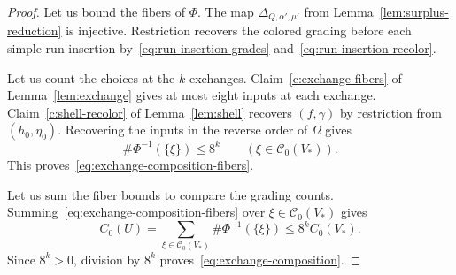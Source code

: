 \begin{proof}
Let us bound the fibers of $\Phi$.
The map $\Delta_{Q,\alpha',\mu'}$ from Lemma~\ref{lem:surplus-reduction} is injective.
Restriction recovers the colored grading before each simple-run insertion
by~\eqref{eq:run-insertion-grades} and~\eqref{eq:run-insertion-recolor}.

Let us count the choices at the $k$ exchanges.
Claim~\ref{c:exchange-fibers} of Lemma~\ref{lem:exchange} gives at most eight
inputs at each exchange.
Claim~\ref{c:shell-recolor} of Lemma~\ref{lem:shell} recovers $(f,\gamma)$ by restriction from $(h_0,\eta_0)$.
Recovering the inputs in the reverse order of $\Omega$ gives
\[
 \#\Phi^{-1}(\{\xi\})\le8^k\qquad(\xi\in\mathcal C_0(V_*)).
\]
This proves~\eqref{eq:exchange-composition-fibers}.

 Let us sum the fiber bounds to compare the grading counts.
Summing~\eqref{eq:exchange-composition-fibers} over $\xi\in\mathcal C_0(V_*)$ gives
\[
 C_0(U)=\sum_{\xi\in\mathcal C_0(V_*)}\#\Phi^{-1}(\{\xi\})
 \le8^k C_0(V_*).
\]
Since $8^k>0$, division by $8^k$ proves~\eqref{eq:exchange-composition}.
\end{proof}

